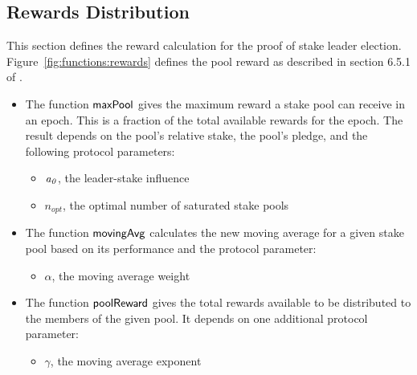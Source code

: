\clearpage

\subsection{Rewards Distribution}
\label{sec:reward-dist}

This section defines the reward calculation for the proof of stake leader election.
Figure~\ref{fig:functions:rewards} defines the pool reward as described in section
6.5.1 of \cite{delegation_design}.

\begin{itemize}
  \item The function $\mathsf{maxPool}$ gives the maximum reward a stake pool can receive in an epoch.
    This is a fraction of the total available rewards for the epoch.
    The result depends on the pool's relative stake, the pool's pledge, and the following
    protocol parameters:
    \begin{itemize}
      \item $\mathit{a_0}$, the leader-stake influence
      \item $n_{opt}$, the optimal number of saturated stake pools
    \end{itemize}
  \item The function $\mathsf{movingAvg}$ calculates the new moving average for a given stake pool
    based on its performance and the protocol parameter:
    \begin{itemize}
      \item $\alpha$, the moving average weight
    \end{itemize}
  \item The function $\mathsf{poolReward}$ gives the total rewards available to be distributed
    to the members of the given pool. It depends on one additional protocol parameter:
    \begin{itemize}
      \item $\gamma$, the moving average exponent
    \end{itemize}
\end{itemize}

